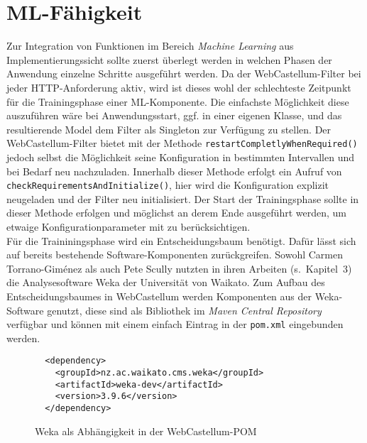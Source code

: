 \section{ML-Fähigkeit}
\label{sec:mlfk}

Zur Integration von Funktionen im Bereich \emph{Machine Learning} aus Implementierungssicht sollte zuerst überlegt werden in welchen Phasen der Anwendung einzelne Schritte ausgeführt werden. Da der WebCastellum-Filter bei jeder HTTP-Anforderung aktiv, wird ist dieses wohl der schlechteste Zeitpunkt für die Trainingsphase einer ML-Komponente. Die einfachste Möglichkeit diese auszuführen wäre bei Anwendungsstart, ggf. in einer eigenen Klasse, und das resultierende Model dem Filter als Singleton zur Verfügung zu stellen. Der WebCastellum-Filter bietet mit der Methode \verb=restartCompletlyWhenRequired()= jedoch selbst die Möglichkeit seine Konfiguration in bestimmten Intervallen und bei Bedarf neu nachzuladen. Innerhalb dieser Methode erfolgt ein Aufruf von \verb=checkRequirementsAndInitialize()=, hier wird die Konfiguration explizit neugeladen und der Filter neu initialisiert. Der Start der Trainingsphase sollte in dieser Methode erfolgen und möglichst an derem Ende ausgeführt werden, um etwaige Konfigurationparameter mit zu berücksichtigen.\\

Für die Traininingsphase wird ein Entscheidungsbaum benötigt. Dafür lässt sich auf bereits bestehende Software-Komponenten zurückgreifen. Sowohl Carmen Torrano-Giménez als auch Pete Scully nutzten in ihren Arbeiten (s.~Kapitel~3) die Analysesoftware Weka der Universität von Waikato. Zum Aufbau des Entscheidungsbaumes in WebCastellum werden Komponenten aus der Weka-Software genutzt, diese sind als Bibliothek im \emph{Maven Central Repository} verfügbar und können mit einem einfach Eintrag in der \verb=pom.xml= eingebunden werden.

\begin{figure}[h]
  \centering
  \begin{lstlisting}
  <dependency>
    <groupId>nz.ac.waikato.cms.weka</groupId>
    <artifactId>weka-dev</artifactId>
    <version>3.9.6</version>
  </dependency>
  \end{lstlisting}
  \caption{Weka als Abhängigkeit in der WebCastellum-POM}
\label{fig:wekapom}

\end{figure}

